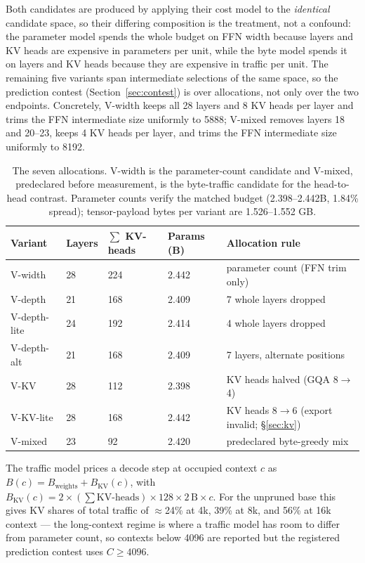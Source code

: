 \documentclass[11pt]{article}
\begin{document}
Both candidates are produced by applying their cost model to the
\emph{identical} candidate space, so their differing composition
is the treatment, not a confound: the parameter model spends the
whole budget on FFN width because layers and KV heads are
expensive in parameters per unit, while the byte model spends it
on layers and KV heads because they are expensive in traffic per
unit. The remaining five variants span intermediate selections of
the same space, so the prediction contest (Section~\ref{sec:contest})
is over allocations, not only over the two endpoints. Concretely,
V-width keeps all 28 layers and 8 KV heads per layer and trims the
FFN intermediate size uniformly to 5888; V-mixed removes layers
18 and 20--23, keeps 4 KV heads per layer, and trims the FFN
intermediate size uniformly to 8192.

\begin{table}[ht]
\centering\small
\begin{tabular}{@{}lllll@{}}
\toprule
Variant & Layers & $\sum$ KV-heads & Params (B) & Allocation rule \\
\midrule
V-width & 28 & 224 & 2.442 & parameter count (FFN trim only) \\
V-depth & 21 & 168 & 2.409 & 7 whole layers dropped \\
V-depth-lite & 24 & 192 & 2.414 & 4 whole layers dropped \\
V-depth-alt & 21 & 168 & 2.409 & 7 layers, alternate positions \\
V-KV & 28 & 112 & 2.398 & KV heads halved (GQA 8$\rightarrow$4) \\
V-KV-lite & 28 & 168 & 2.442 & KV heads 8$\rightarrow$6 (export invalid; \S\ref{sec:kv}) \\
V-mixed & 23 & 92 & 2.420 & predeclared byte-greedy mix \\
\bottomrule
\end{tabular}
\caption{The seven allocations. V-width is the parameter-count
candidate and V-mixed, predeclared before measurement, is the
byte-traffic candidate for the head-to-head contrast. Parameter
counts verify the matched budget (2.398--2.442B, 1.84\% spread);
tensor-payload bytes per variant are 1.526--1.552 GB.}
\end{table}

The traffic model prices a decode step at occupied context $c$ as
$B(c) = B_{\text{weights}} + B_{\text{KV}}(c)$, with
$B_{\text{KV}}(c) = 2 \times (\sum \text{KV-heads}) \times 128
\times 2\,\text{B} \times c$. For the unpruned base this gives KV
shares of total traffic of $\approx$24\% at 4k, 39\% at 8k, and
56\% at 16k context --- the long-context regime is where a traffic
model has room to differ from parameter count, so contexts below
4096 are reported but the registered prediction contest uses
$C \geq 4096$.
\end{document}
